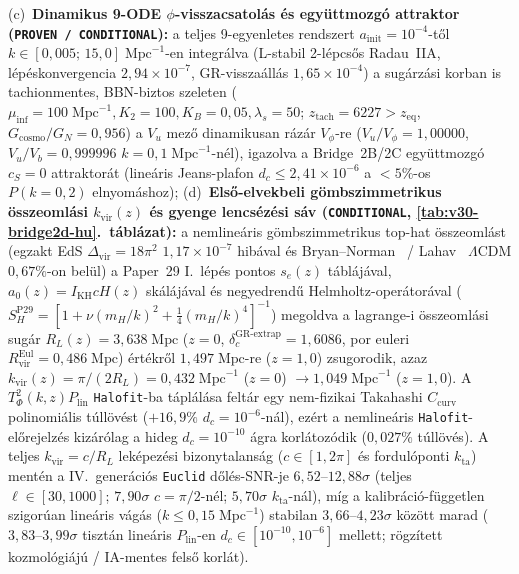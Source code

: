 \documentclass[11pt,a4paper]{article}
\begin{document}
\begin{enumerate}
    (c)~\textbf{Dinamikus 9-ODE $\phi$-visszacsatolás és együttmozgó attraktor (\texttt{PROVEN / CONDITIONAL}):} a teljes 9-egyenletes rendszert $a_{\mathrm{init}}=10^{-4}$-től $k \in [0{,}005;\, 15{,}0]\;\mathrm{Mpc}^{-1}$-en integrálva (L-stabil 2-lépcsős Radau~IIA, lépéskonvergencia $2{,}94\times 10^{-7}$, GR-visszaállás $1{,}65\times 10^{-4}$) a sugárzási korban is tachionmentes, BBN-biztos szeleten ($\mu_{\mathrm{inf}}=100\;\mathrm{Mpc}^{-1}, K_2=100, K_B=0{,}05, \lambda_s=50$; $z_{\mathrm{tach}}=6227 > z_{\mathrm{eq}}$, $G_{\mathrm{cosmo}}/G_N = 0{,}956$) a $V_u$ mező dinamikusan rázár $V_\phi$-re ($V_u/V_\phi = 1{,}00000$, $V_u/V_b = 0{,}999996$ $k=0{,}1\;\mathrm{Mpc}^{-1}$-nél), igazolva a Bridge~2B/2C együttmozgó $c_S = 0$ attraktorát (lineáris Jeans-plafon $d_c \le 2{,}41\times 10^{-6}$ a $<5\%$-os $P(k=0{,}2)$ elnyomáshoz);
    (d)~\textbf{Első-elvekbeli gömbszimmetrikus összeomlási $k_{\mathrm{vir}}(z)$ és gyenge lencsézési sáv (\texttt{CONDITIONAL}, \ref{tab:v30-bridge2d-hu}.~táblázat):} a nemlineáris gömbszimmetrikus top-hat összeomlást (egzakt EdS $\Delta_{\mathrm{vir}}=18\pi^2$ $1{,}17\times 10^{-7}$ hibával és Bryan--Norman~\cite{BryanNorman1998} / Lahav~\cite{Lahav1991} $\Lambda$CDM $0{,}67\%$-on belül) a Paper~29 I.~lépés pontos $s_e(z)$ táblájával, $a_0(z)=I_{\mathrm{KH}}cH(z)$ skálájával és negyedrendű Helmholtz-operátorával ($S_H^{\mathrm{P29}} = [1 + \nu(m_H/k)^2 + \frac{1}{4}(m_H/k)^4]^{-1}$) megoldva a lagrange-i összeomlási sugár $R_L(z) = 3{,}638\;\mathrm{Mpc}$ ($z=0$, $\delta_c^{\mathrm{GR\text{-}extrap}} = 1{,}6086$, por euleri $R_{\mathrm{vir}}^{\mathrm{Eul}} = 0{,}486\;\mathrm{Mpc}$) értékről $1{,}497\;\mathrm{Mpc}$-re ($z=1{,}0$) zsugorodik, azaz $k_{\mathrm{vir}}(z) = \pi/(2 R_L) = 0{,}432\;\mathrm{Mpc}^{-1}$ ($z=0$) $\to 1{,}049\;\mathrm{Mpc}^{-1}$ ($z=1{,}0$). A $T_\Phi^2(k,z)P_{\mathrm{lin}}$ \texttt{Halofit}-ba táplálása feltár egy nem-fizikai Takahashi $C_{\mathrm{curv}}$ polinomiális túllövést ($+16{,}9\%$ $d_c=10^{-6}$-nál), ezért a nemlineáris \texttt{Halofit}-előrejelzés kizárólag a hideg $d_c = 10^{-10}$ ágra korlátozódik ($0{,}027\%$ túllövés). A teljes $k_{\mathrm{vir}} = c/R_L$ leképezési bizonytalanság ($c \in [1, 2\pi]$ és fordulóponti $k_{\mathrm{ta}}$) mentén a IV.\ generációs \texttt{Euclid} dőlés-SNR-je \textbf{$6{,}52\text{--}12{,}88\sigma$} (teljes $\ell\in[30,1000]$; $7{,}90\sigma$ $c=\pi/2$-nél; $5{,}70\sigma$ $k_{\mathrm{ta}}$-nál), míg a kalibráció-független szigorúan lineáris vágás ($k \le 0{,}15\;\mathrm{Mpc}^{-1}$) stabilan \textbf{$3{,}66\text{--}4{,}23\sigma$} között marad ($3{,}83\text{--}3{,}99\sigma$ tisztán lineáris $P_{\mathrm{lin}}$-en $d_c \in [10^{-10}, 10^{-6}]$ mellett; rögzített kozmológiájú / IA-mentes felső korlát).
\end{enumerate}
\end{document}
